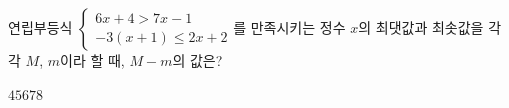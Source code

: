 연립부등식 $\begin{cases} 6x+4>7x-1 \\ -3(x+1)\le 2x+2 \end{cases}$를 만족시키는 정수 $x$의 최댓값과 최솟값을 각각 $M$, $m$이라 할 때, $M-m$의 값은?
\begin{choices32}{$4$}{$5$}{$6$}{$7$}{$8$}\end{choices32}
